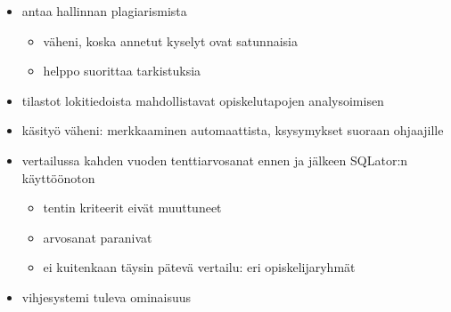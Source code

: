 \begin{itemize}
    \item antaa hallinnan plagiarismista
    \begin{itemize}
        \item väheni, koska annetut kyselyt ovat satunnaisia
        \item helppo suorittaa tarkistuksia
    \end{itemize}
    \item tilastot lokitiedoista mahdollistavat opiskelutapojen analysoimisen
    \item käsityö väheni: merkkaaminen automaattista, ksysymykset suoraan ohjaajille
    \item vertailussa kahden vuoden tenttiarvosanat ennen ja jälkeen SQLator:n käyttöönoton
    \begin{itemize}
        \item tentin kriteerit eivät muuttuneet
        \item arvosanat paranivat
        \item ei kuitenkaan täysin pätevä vertailu: eri opiskelijaryhmät
    \end{itemize}
    \item vihjesystemi tuleva ominaisuus
\end{itemize}

